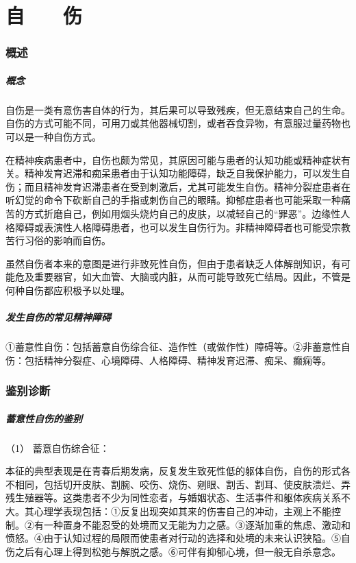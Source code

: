 \protect\hypertarget{text00053.html}{}{}

\section{自　　伤}

\subsubsection{概述}

\subparagraph{概念}

自伤是一类有意伤害自体的行为，其后果可以导致残疾，但无意结束自己的生命。自伤的方式可能不同，可用刀或其他器械切割，或者吞食异物，有意服过量药物也可以是一种自伤方式。

在精神疾病患者中，自伤也颇为常见，其原因可能与患者的认知功能或精神症状有关。精神发育迟滞和痴呆患者由于认知功能障碍，缺乏自我保护能力，可以发生自伤；而且精神发育迟滞患者在受到刺激后，尤其可能发生自伤。精神分裂症患者在听幻觉的命令下砍断自己的手指或刺伤自己的眼睛。抑郁症患者也可能采取一种痛苦的方式折磨自己，例如用烟头烧灼自己的皮肤，以减轻自己的“罪恶”。边缘性人格障碍或表演性人格障碍患者，也可以发生自伤行为。非精神障碍者也可能受宗教苦行习俗的影响而自伤。

虽然自伤者本来的意图是进行非致死性自伤，但由于患者缺乏人体解剖知识，有可能危及重要器官，如大血管、大脑或内脏，从而可能导致死亡结局。因此，不管是何种自伤都应积极予以处理。

\subparagraph{发生自伤的常见精神障碍}

①蓄意性自伤：包括蓄意自伤综合征、造作性（或做作性）障碍等。②非蓄意性自伤：包括精神分裂症、心境障碍、人格障碍、精神发育迟滞、痴呆、癫痫等。

\subsubsection{鉴别诊断}

\subparagraph{蓄意性自伤的鉴别}

\hypertarget{text00053.htmlux5cux23CHP1-18-11-2-1-1}{}
（1） 蓄意自伤综合征：

本征的典型表现是在青春后期发病，反复发生致死性低的躯体自伤，自伤的形式各不相同，包括切开皮肤、割腕、咬伤、烧伤、剜眼、割舌、割耳、使皮肤溃烂、弄残生殖器等。这类患者不少为同性恋者，与婚姻状态、生活事件和躯体疾病关系不大。其心理学表现包括：①反复出现突如其来的伤害自己的冲动，主观上不能控制。②有一种置身不能忍受的处境而又无能为力之感。③逐渐加重的焦虑、激动和愤怒。④由于认知过程的局限而使患者对行动的选择和处境的未来认识狭隘。⑤自伤之后有心理上得到松弛与解脱之感。⑥可伴有抑郁心境，但一般无自杀意念。

